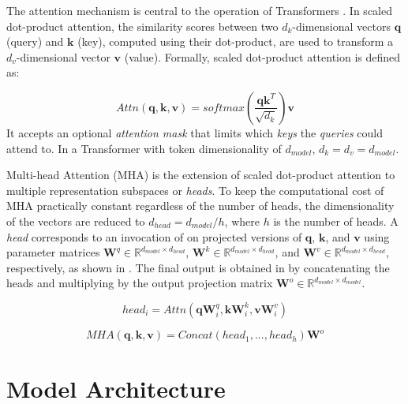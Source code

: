The attention mechanism is central to the operation of Transformers \cite{vaswani2017attention}. In scaled dot-product attention, the similarity scores between two $d_k$-dimensional vectors $\mathbf{q}$ (query) and $\mathbf{k}$ (key), computed using their dot-product, are used to transform a $d_v$-dimensional vector $\mathbf{v}$ (value). Formally, scaled dot-product attention is defined as:

\begin{equation}
  Attn(\mathbf{q}, \mathbf{k}, \mathbf{v}) = softmax \left( \frac{\mathbf{q}\mathbf{k}^T}{\sqrt{d_k}} \right) \mathbf{v}
  \label{eq:sdpattn}
\end{equation}It accepts an optional \textit{attention mask} that limits which \textit{keys} the \textit{queries} could attend to. In a Transformer with token dimensionality of $d_{model}$, $d_k = d_v = d_{model}$.

Multi-head Attention (MHA) is the extension of scaled dot-product attention to multiple representation subspaces or \textit{heads}. To keep the computational cost of MHA practically constant regardless of the number of heads, the dimensionality of the vectors are reduced to $d_{head} = d_{model} / h$, where $h$ is the number of heads. A \textit{head} corresponds to an invocation of  on projected versions of $\mathbf{q}$, $\mathbf{k}$, and $\mathbf{v}$ using parameter matrices $\mathbf{W}^q \in \mathbb{R}^{d_{model}\times{d_{head}}}$, $\mathbf{W}^k \in \mathbb{R}^{d_{model}\times{d_{head}}}$, and $\mathbf{W}^v \in \mathbb{R}^{d_{model}\times{d_{head}}}$, respectively, as shown in . The final output is obtained in  by concatenating the heads and multiplying by the output projection matrix $\mathbf{W}^o \in \mathbb{R}^{{d_{model}}\times{d_{model}}}$.

\begin{equation}
    head_i = Attn(\mathbf{q}\mathbf{W}^q_i, \mathbf{k}\mathbf{W}^k_i, \mathbf{v}\mathbf{W}^v_i)
    \label{eq:attn_head}
\end{equation}

\begin{equation}
    MHA(\mathbf{q}, \mathbf{k}, \mathbf{v}) = Concat(head_1, ..., head_h)\mathbf{W}^o
  \label{eq:mha}
\end{equation}


\section{Model Architecture}
\label{ch:arch-appendix}

